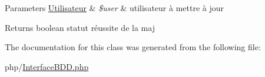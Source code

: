 \begin{DoxyParams}[1]{Parameters}
\mbox{\hyperlink{class_utilisateur}{Utilisateur}} & {\em \$user} & utilisateur à mettre à jour\\
\hline
\end{DoxyParams}
\begin{DoxyReturn}{Returns}
boolean statut réussite de la maj 
\end{DoxyReturn}


The documentation for this class was generated from the following file\+:\begin{DoxyCompactItemize}
\item 
php/\mbox{\hyperlink{_interface_b_d_d_8php}{Interface\+B\+D\+D.\+php}}\end{DoxyCompactItemize}
